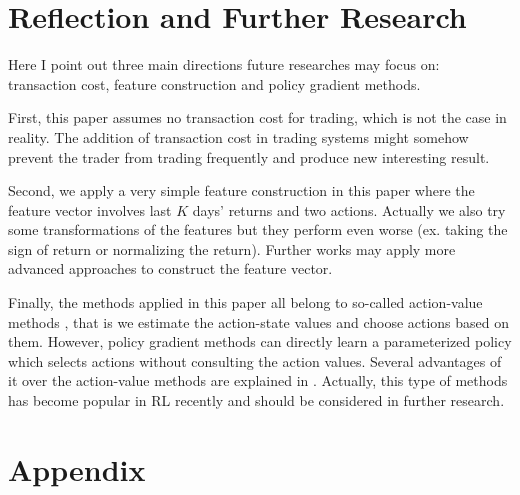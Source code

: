 \documentclass{article}
\begin{document}
\section{Reflection and Further Research} %

\noindent Here I point out three main directions future researches may focus on: transaction cost, feature construction and policy gradient methods.

\indent First, this paper assumes no transaction cost for trading, which is not the case in reality. The addition of transaction cost in trading systems might somehow prevent the trader from trading frequently and produce new interesting result.

\indent Second, we apply a very simple feature construction in this paper where the feature vector involves last $K$ days' returns and two actions. Actually we also try some transformations of the features but they perform even worse (ex. taking the sign of return or normalizing the return). Further works may apply more advanced approaches to construct the feature vector.

\indent Finally, the methods applied in this paper all belong to
so-called action-value methods \cite{sutton2018reinforcement}, that is we estimate the action-state values and choose actions based on them. However, policy gradient methods can directly learn a parameterized policy which selects actions without consulting the action values. Several advantages of it over the action-value methods are explained in \cite{sutton2018reinforcement}. Actually, this type of methods has become popular in RL recently and should be considered in further research.

\clearpage

   




\section*{Appendix} %
\end{document}
